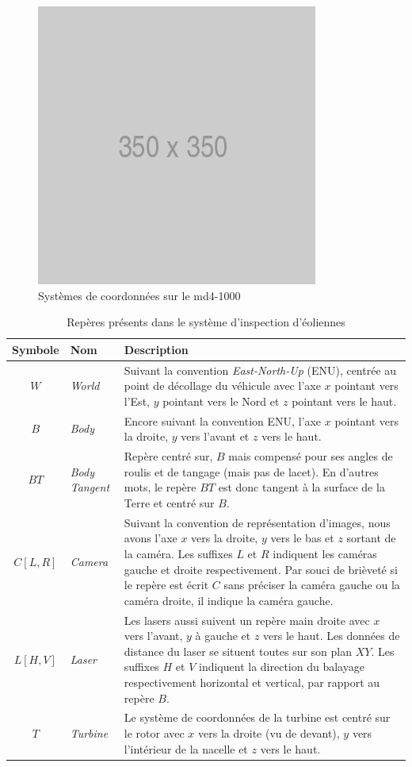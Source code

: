 \begin{figure}[htp]
  \centering
  \includegraphics[width=0.5\linewidth]{images/placeholder.png}
  \caption{Systèmes de coordonnées sur le md4-1000}
  \label{fig:md41000}
\end{figure}

\begin{table}[htp]
  \centering
  \setlength{\tabcolsep}{12pt}
  \begin{tabular}[htp]{|c|l|p{10cm}|}
    \hline
    Symbole & Nom                   & Description\\\hline
    $W$     &  \textit{World}       & Suivant la convention \textit{East-North-Up} (ENU), centrée au point de décollage du véhicule avec l'axe $x$ pointant vers l'Est, $y$ pointant vers le Nord et $z$ pointant vers le haut.\\ \hline
    $B$     &  \textit{Body}        & Encore suivant la convention ENU, l'axe $x$ pointant vers la droite, $y$ vers l'avant et $z$ vers le haut. \\ \hline
    $\mathit{BT}$  &  \textit{Body Tangent} & Repère centré sur, $B$ mais compensé pour ses angles de roulis et de tangage (mais pas de lacet). En d'autres mots, le repère ${BT}$ est donc tangent à la surface de la Terre et centré sur $B$. \\ \hline
    $\mathit{C[L,R]}$ & \textit{Camera} & Suivant la convention de représentation d'images, nous avons l'axe $x$ vers la droite, $y$ vers le bas et $z$ sortant de la caméra. Les suffixes $L$ et $R$ indiquent les caméras gauche et droite respectivement. Par souci de brièveté si le repère est écrit $C$ sans préciser la caméra gauche ou la caméra droite, il indique la caméra gauche.   \\ \hline
    $\mathit{L[H,V]}$ & \textit{Laser}& Les lasers aussi suivent un repère main droite avec $x$ vers l'avant, $y$ à gauche et $z$ vers le haut. Les données de distance du laser se situent toutes sur son plan $XY$. Les suffixes $H$ et $V$ indiquent la direction du balayage respectivement horizontal et vertical, par rapport au repère $B$. \\ \hline
    $\mathit{T}$ & \textit{Turbine} & Le système de coordonnées de la turbine est centré sur le rotor avec $x$ vers la droite (vu de devant), $y$ vers l'intérieur de la nacelle et $z$ vers le haut. \\ \hline
  \end{tabular}
  \setlength{\tabcolsep}{6pt}
  \caption{Repères présents dans le système d'inspection d'éoliennes}
  \label{table:coordinate_frames}
\end{table}

